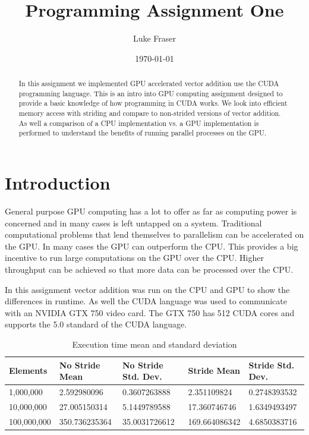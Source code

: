 \documentclass[letterpaper,twocolumn]{article}
\author{Luke Fraser}
\title{Programming Assignment One}
\date{\today}
\begin{document}
\maketitle

\begin{abstract}
In this assignment we implemented GPU accelerated vector addition use the CUDA programming language. This is an intro into GPU computing assignment designed to provide a basic knowledge of how programming in CUDA works. We look into efficient memory access with striding and compare to non-strided versions of vector addition. As well a comparison of a CPU implementation vs. a GPU implementation is performed to understand the benefits of running parallel processes on the GPU.
\end{abstract}

\section{Introduction}
General purpose GPU computing has a lot to offer as far as computing power is concerned and in many cases is left untapped on a system. Traditional computational problems that lend themselves to parallelism can be accelerated on the GPU. In many cases the GPU can outperform the CPU. This provides a big incentive to run large computations on the GPU over the CPU. Higher throughput can be achieved so that more data can be processed over the CPU.

In this assignment vector addition was run on the CPU and GPU to show the differences in runtime. As well the CUDA language was used to communicate with an NVIDIA GTX 750 video card. The GTX 750 has 512 CUDA cores and supports the 5.0 standard of the CUDA language.

\begin{table}
\centering
\begin{tabular}[c]{|l|l|l|l|l|} \hline
Elements & No Stride Mean & No Stride Std. Dev. & Stride Mean & Stride Std. Dev.\\ \hline
1,000,000 & 2.592980096 & 0.3607263888 & 2.351109824 & 0.2748393532\\ \hline
10,000,000 & 27.005150314 & 5.1449789588 & 17.360746746 & 1.6349493497\\ \hline
100,000,000 & 350.736235364 & 35.0031726612 & 169.664086342 & 4.6850383716 \\ \hline
\end{tabular}
\caption{Execution time mean and standard deviation}
\label{tab:exec}
\end{table}
\end{document}
